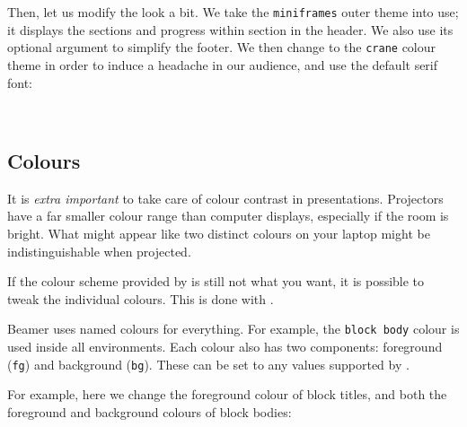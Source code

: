 Then, let us modify the look a bit.
We take the \verb|miniframes| outer theme into use;
it displays the sections and progress within section in the header.
We also use its optional argument to simplify the footer.
We then change to the \verb|crane| colour theme in order to induce a headache in our audience,
and use the default serif font:
%
\begin{ExampleCode}
\beamertemplatenavigationsymbolsempty
{}
\end{ExampleCode}
%
\begin{center}
~
\end{center}



%
%
\subsection{Colours}

\begin{practices}
It is \emph{extra important} to take care of colour contrast in presentations.
Projectors have a far smaller colour range than computer displays,
especially if the room is bright.
What might appear like two distinct colours on your laptop
might be indistinguishable when projected.
\end{practices}

If the colour scheme provided by  is still not what you want,
it is possible to tweak the individual colours.
This is done with .

Beamer uses named colours for everything.
For example, the \verb|block body| colour is used inside all  environments.
Each colour also has two components: foreground (\verb|fg|) and background (\verb|bg|).
These can be set to any values supported by .

For example, here we change the foreground colour of block titles,
and both the foreground and background colours of block bodies:%
\begin{ExampleCode}
\end{ExampleCode}
%
\begin{center}
\end{center}

